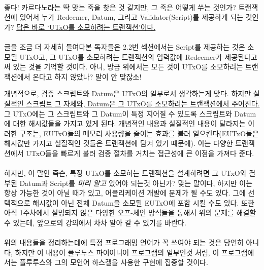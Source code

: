 \documentclass[a4paper, 11pt]{article}
\begin{document}
    \paragraph{} 좋다! 카르다노라는 딱 맞는 죽을 찾은 것 같지만, 그 죽은 어떻게 쑤는 것인가? 트랜잭션에 있어서 누가 Redeemer, Datum, 그리고 Validator(Script)를 제공하게 되는 것인가? \uline{답은 바로 `UTxO를 소모하려는 트랜잭션'이다.}

    \paragraph{} 글을 조금 더 자세히 들여다본 독자들은 2.2번 섹션에서는 Script를 제공하는 것은 소모될 UTxO고, 그 UTxO를 소모하려는 트랜잭션의 입력값에 Redeemer가 제공된다고 써 있는 것을 기억할 것이다. 아니, 방금 위에서는 모든 것이 UTxO를 소모하려는 트랜잭션에서 온다고 하지 않았나? 말이 안 맞잖소! 

    개념적으로, 검증 스크립트와 Datum은 UTxO의 일부로서 생각하는게 맞다. 하지만 \uline{실질적인 스크립트 그 자체와, Datum은 그 UTxO를 소모하려는 트랜잭션에서 주어진다.} 그 UTxO에는 그 스크립트와 그 Datum이 특정 지어질 수 있도록 스크립트와 Datum에 대한 해시값들을 가지고 있게 된다. 개념적인 내용과 실질적인 내용이 달라지는 이러한 구조는, EUTxO들의 메모리 사용량을 줄이는 효과를 불러 일으킨다(EUTxO들은 해시값만 가지고 실질적인 것들은 트랜잭션에 담겨 있기 때문에). 이는 다양한 트랜잭션에서 UTxO들을 빠르게 불러 검증 절차를 거치는 접근성에 큰 이점을 가져다 준다.

    \paragraph{} 하지만, 이 말인 즉슨, 특정 UTxO를 소모하는 트랜잭션을 설계하려면 그 UTxO와 결부된 Datum과 Script를 \emph{미리 알고} 있어야 되는것 아닌가? 맞는 말이다, 하지만 이는 항상 가능한 것이 아닐 때가 있고, 어플리케이션 개발에 문제가 될 수도 있다. 그에 선택적으로 해시값이 아닌 전체 Datum을 소모될 EUTxO에 포함 시킬 수도 있다. 또한 아직 1주차에서 설명되지 않은 다양한 오프-체인 방식들을 통해서 위의 문제를 해결할 수 있는데, 앞으로의 강의에서 차차 알아 갈 수 있기를 바란다.

    \paragraph{} 위의 내용들을 정리하는데에 특정 프로그래밍 언어가 꼭 쓰여야 되는 것은 당연히 아니다, 하지만 이 내용이 플루투스 파이어니어 프로그램의 일부인것 처럼, 이 프로그램에서는 플루투스와 그의 모언어 하스켈을 사용한 구현에 집중할 것이다.
\end{document}
